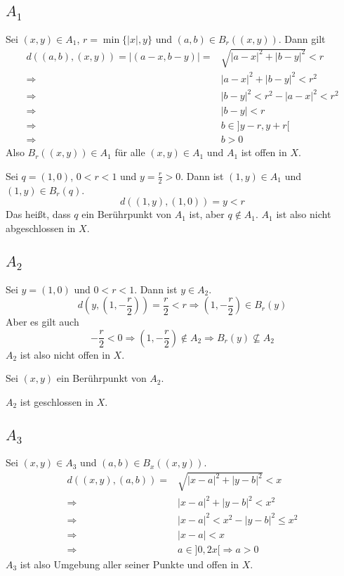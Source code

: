 \documentclass[10pt,a4paper]{article}
\begin{document}
\subsection*{$A_{1}$}

Sei $(x, y) \in A_{1}$, $r = \min \{|x|, y\}$ und $(a, b) \in B_{r}((x, y))$.
Dann gilt
\begin{align*}
d((a, b), (x, y)) = |(a - x, b - y)| = & \sqrt{|a - x|^{2} + |b - y|^{2}} < r\\
\Rightarrow & |a - x|^{2} + |b - y|^{2} < r^{2}\\
\Rightarrow & |b - y|^{2} < r^{2} - |a - x|^{2} < r^{2}\\
\Rightarrow & |b - y| < r\\
\Rightarrow & b \in ]y - r, y + r[\\
\Rightarrow & b > 0
\end{align*}
Also $B_{r}((x, y)) \in A_{1}$ für alle $(x, y) \in A_{1}$ und $A_{1}$ ist offen in $X$.

Sei $q = (1, 0)$, $0 < r < 1$ und $y = \frac{r}{2} > 0$.
Dann ist $(1, y) \in A_{1}$ und $(1, y) \in B_{r}(q)$.
\begin{equation}
d((1, y), (1, 0)) = y < r
\end{equation}
Das heißt, dass $q$ ein Berührpunkt von $A_{1}$ ist, aber $q \notin A_{1}$. 
$A_{1}$ ist also nicht abgeschlossen in $X$.

\subsection*{$A_{2}$}

Sei $y = (1, 0)$ und $0 < r < 1$.
Dann ist $y \in A_{2}$.
\begin{equation}
d(y, (1, -\frac{r}{2})) = \frac{r}{2} < r \Rightarrow (1, -\frac{r}{2}) \in B_{r}(y)
\end{equation}
Aber es gilt auch
\begin{equation}
-\frac{r}{2} < 0 \Rightarrow (1, -\frac{r}{2}) \notin A_{2} \Rightarrow B_{r}(y) \nsubseteq A_{2}
\end{equation}
$A_{2}$ ist also nicht offen in $X$.

Sei $(x, y)$ ein Berührpunkt von $A_{2}$.

$A_{2}$ ist geschlossen in $X$.

\subsection*{$A_{3}$}

Sei $(x, y) \in A_{3}$ und $(a, b) \in B_{x}((x, y))$.
\begin{align}
d((x, y), (a, b)) = & \sqrt{|x - a|^{2} + |y - b|^{2}} < x\\
\Rightarrow & |x - a|^{2} + |y - b|^{2} < x^{2}\\
\Rightarrow & |x - a|^{2} < x^{2} - |y - b|^{2} \le x^{2}\\
\Rightarrow & |x - a| < x\\
\Rightarrow & a \in ]0, 2x[ \Rightarrow a > 0
\end{align}
$A_{3}$ ist also Umgebung aller seiner Punkte und offen in $X$.
\end{document}
